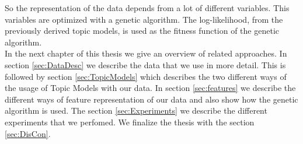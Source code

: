 \documentclass[11pt,a4paper]{article}
\begin{document}
So the representation of the data depends from a lot of different variables. This variables are optimized with a genetic algorithm. The log-likelihood, from the previously derived topic models, is used as the fitness function of the genetic algorithm.\\

In the next chapter of this thesis we give an overview of related approaches. In section \ref{sec:DataDesc} we describe the data that we use in more detail. This is followed by section \ref{sec:TopicModels} which describes the two different ways of the usage of Topic Models with our data. In section \ref{sec:features} we describe the different ways of feature representation of our data and also show how the genetic algorithm is used. The section \ref{sec:Experiments} we describe the different experiments that we perfomed. We finalize the thesis with the section \ref{sec:DisCon}.


% 
% 
% 
\pagebreak
\end{document}
